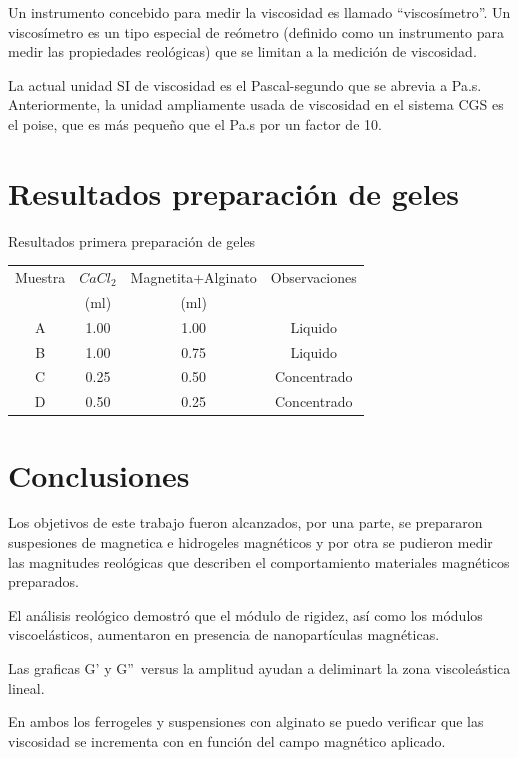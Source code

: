 \documentclass[review]{elsarticle}
\begin{document}
Un instrumento concebido para
medir la viscosidad es llamado ``viscos\'imetro''. Un viscos\'imetro es un tipo especial de re\'ometro (definido como un instrumento
para medir las propiedades reol\'ogicas) que se limitan a la medici\'on de viscosidad.

La actual unidad SI de viscosidad es
el Pascal-segundo que se abrevia a Pa.s. Anteriormente, la unidad ampliamente usada de viscosidad en el sistema CGS es el poise, que es m\'as peque{\~n}o
que el Pa.s por un factor de 10.


\section{Resultados preparaci\'on de geles}
Resultados primera preparaci\'on de geles


\begin{table}[h!]
  \centering
  \begin{tabular}{|c|c|c|c|}
  \hline
  Muestra  & $C a C l_{2}$  & Magnetita+Alginato  & Observaciones  \\
  & (ml) & (ml)  &  \\
  \hline
  A & 1.00  & 1.00  & Liquido \\
  \hline
  B  & 1.00  & 0.75 & Liquido  \\
  \hline
  C  & 0.25 & 0.50  & Concentrado  \\
  \hline
  D & 0.50  & 0.25  & Concentrado \\
  \hline
  \end{tabular}
\end{table}

\section{Conclusiones}
Los objetivos de este trabajo fueron alcanzados, por una parte, se prepararon suspesiones de magnetica e hidrogeles magn\'eticos y por otra se pudieron medir las magnitudes reol\'ogicas que describen el comportamiento materiales magn\'eticos preparados.

El an\'alisis reol\'ogico demostr\'o que el m\'odulo de rigidez, as\'i como los m\'odulos viscoel\'asticos, aumentaron en presencia de nanopart\'iculas magn\'eticas.

Las graficas G' y G''\ versus la amplitud ayudan a deliminart la zona viscole\'astica lineal.

En ambos los ferrogeles y suspensiones con alginato se puedo verificar que las viscosidad se incrementa con en funci\'on del campo magn\'etico aplicado.


\end{document}
